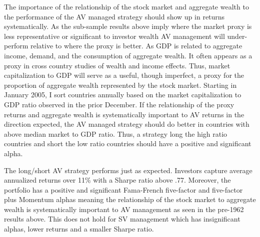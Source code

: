 The importance of the relationship of the stock market and aggregate wealth to the performance of the AV managed strategy should show up in returns systematically. As the sub-sample results above imply where the market proxy is less representative or significant to investor wealth AV management will under-perform relative to where the proxy is better. As GDP is related to aggregate income, demand, and the consumption of aggregate wealth. It often appears as a proxy in cross country studies of wealth and income effects. \citep{barro_cross-country_1989,levine_what_1993,baird_aggregate_2010} Thus, market capitalization to GDP will serve as a useful, though imperfect, a proxy for
the proportion of aggregate wealth represented by the stock market. Starting in January 2005, I sort countries annually based on the market capitalization to GDP ratio observed in the prior December. If the relationship of the proxy returns and aggregate wealth is systematically important to AV returns in the direction expected, the AV managed strategy should do better in countries with above median market to GDP ratio. Thus, a strategy long the high ratio countries and short the low ratio countries should have a positive and significant alpha. 

The long/short AV strategy performs just as expected. Investors capture average annualized
returns over 11\% with a Sharpe ratio above .77. Moreover,
the portfolio has a positive and significant Fama-French five-factor and five-factor plus Momentum
alphas meaning the relationship of the stock market to aggregate wealth is systematically important
 to AV management as seen in the pre-1962 results above. This does not hold for SV management
which has insignificant alphas, lower returns and a smaller Sharpe ratio.